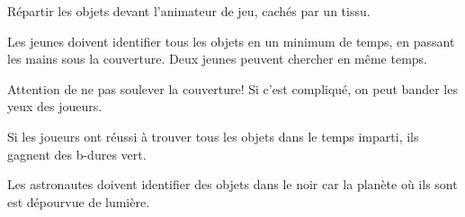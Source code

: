 \documentclass{grand-jeu}
\begin{document}
\begin{liste-materiel}
\end{liste-materiel}

\begin{regles}
Répartir les objets devant l’animateur de jeu, cachés par un tissu. 

Les jeunes doivent identifier tous les objets en un minimum de temps, en passant les mains sous la couverture.
Deux jeunes peuvent chercher en même temps.

Attention de ne pas soulever la couverture! Si c'est compliqué, on peut bander les yeux des joueurs.

Si les joueurs ont réussi à trouver tous les objets dans le temps imparti, ils gagnent des b-dures vert.
\end{regles}

\begin{imaginaire}
Les astronautes doivent identifier des objets dans le noir car la planète où ils sont est dépourvue de lumière. 
\end{imaginaire}

\begin{moments-stop}
\end{moments-stop}
\end{document}
